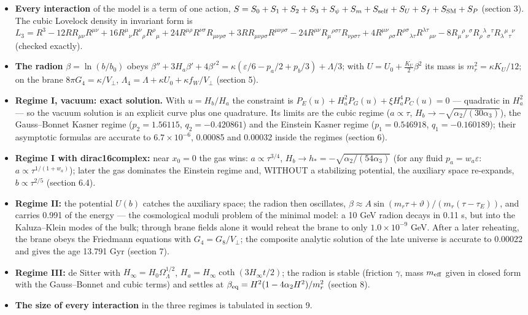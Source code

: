 \documentclass[10pt,a4paper]{article}
\begin{document}
\begin{itemize}
\item \textbf{Every interaction} of the model is a term of one action, $S=S_0+S_1+S_2+S_3+S_\psi+S_m+S_{\rm self}+S_U+S_f+S_{\rm SM}+S_P$ (section 3). The cubic Lovelock density in invariant form is $L_3=R^3-12RR_{\mu\nu}R^{\mu\nu}+16R^\mu{}_\nu R^\nu{}_\rho R^\rho{}_\mu+24R^{\mu\rho}R^{\nu\sigma}R_{\mu\nu\rho\sigma}+3RR_{\mu\nu\rho\sigma}R^{\mu\nu\rho\sigma}-24R^{\mu\nu}R_\mu{}^{\rho\sigma\tau}R_{\nu\rho\sigma\tau}+4R^{\mu\nu}{}_{\rho\sigma}R^{\rho\sigma}{}_{\lambda\tau}R^{\lambda\tau}{}_{\mu\nu}-8R_\mu{}^\rho{}_\nu{}^\sigma R_\rho{}^\lambda{}_\sigma{}^\tau R_\lambda{}^\mu{}_\tau{}^\nu$ (checked exactly).
\item \textbf{The radion} $\beta=\ln(b/b_0)$ obeys $\beta''+3H_a\beta'+4\beta'^2=\kappa(\varepsilon/6-p_a/2+p_b/3)+\Lambda/3$; with $U=U_0+\tfrac{K_U}{2}\beta^2$ its mass is $m_r^2=\kappa K_U/12$; on the brane $8\pi G_4=\kappa/V_\perp$, $\Lambda_4=\Lambda+\kappa U_0+\kappa f_W/V_\perp$ (section 5).
\item \textbf{Regime I, vacuum: exact solution.} With $u=H_b/H_a$ the constraint is $P_E(u)+H_a^2P_G(u)+\xi H_a^4P_C(u)=0$ — quadratic in $H_a^2$ — so the vacuum solution is an explicit curve plus one quadrature. Its limits are the cubic regime ($a\propto\tau$, $H_b\to-\sqrt{\alpha_2/(30\alpha_3)}$), the Gauss–Bonnet Kasner regime ($p_2=1.56115$, $q_2=-0.420861$) and the Einstein Kasner regime ($p_1=0.546918$, $q_1=-0.160189$); their asymptotic formulas are accurate to $6.7\times10^{-6}$, 0.00085 and 0.00032 inside the regimes (section 6).
\item \textbf{Regime I with dirac16complex:} near $x_0=0$ the gas wins: $a\propto\tau^{3/4}$, $H_b\to h_*=-\sqrt{\alpha_2/(54\alpha_3)}$ (for any fluid $p_a=w_a\varepsilon$: $a\propto\tau^{1/(1+w_a)}$); later the gas dominates the Einstein regime and, WITHOUT a stabilizing potential, the auxiliary space re-expands, $b\propto\tau^{2/5}$ (section 6.4).
\item \textbf{Regime II:} the potential $U(b)$ catches the auxiliary space; the radion then oscillates, $\beta\approx A\sin(m_r\tau+\vartheta)/(m_r(\tau-\tau_E))$, and carries 0.991 of the energy — the cosmological moduli problem of the minimal model: a 10 GeV radion decays in 0.11 s, but into the Kaluza–Klein modes of the bulk; through brane fields alone it would reheat the brane to only $1.0\times10^{-9}$ GeV. After a later reheating, the brane obeys the Friedmann equations with $G_4=G_8/V_\perp$; the composite analytic solution of the late universe is accurate to 0.00022 and gives the age 13.791 Gyr (section 7).
\item \textbf{Regime III:} de Sitter with $H_\infty=H_0\Omega_\Lambda^{1/2}$, $H_a=H_\infty\coth(3H_\infty t/2)$; the radion is stable (friction $\gamma$, mass $m_{\rm eff}$ given in closed form with the Gauss–Bonnet and cubic terms) and settles at $\beta_{\rm eq}=H^2(1-4\alpha_2H^2)/m_r^2$ (section 8).
\item \textbf{The size of every interaction} in the three regimes is tabulated in section 9.
\end{itemize}
\end{document}
